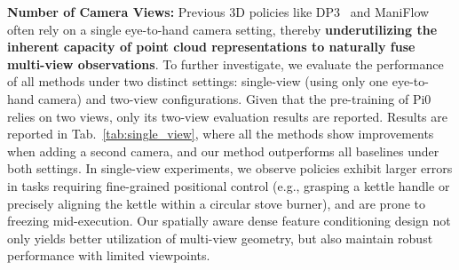 \documentclass[runningheads]{llncs}
\begin{document}
\textbf{Number of Camera Views:} Previous 3D policies like DP3~\cite{ze20243d} and ManiFlow~\cite{yan2025maniflowgeneralrobotmanipulation} often rely on a single eye-to-hand camera setting, thereby \textbf{underutilizing the inherent capacity of point cloud representations to naturally fuse multi-view observations}. To further investigate, we evaluate the performance of all methods under two distinct settings: single-view (using only one eye-to-hand camera) and two-view configurations. Given that the pre-training of Pi0~\cite{black2024pi_0} relies on two views, only its two-view evaluation results are reported. Results are reported in Tab.~\ref{tab:single_view}, where all the methods show improvements when adding a second camera, and our method outperforms all baselines under both settings. In single-view experiments, we observe policies exhibit larger errors in tasks requiring fine-grained positional control (e.g., grasping a kettle handle or precisely aligning the kettle within a circular stove burner), and are prone to freezing mid-execution. Our spatially aware dense feature conditioning design not only yields better utilization of multi-view geometry, but also maintain robust performance with limited viewpoints.
\end{document}
